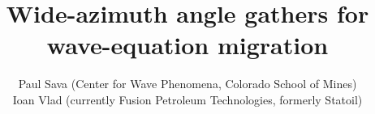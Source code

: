 



\title{Wide-azimuth angle gathers for wave-equation migration}
\author{
Paul Sava (Center for Wave Phenomena, Colorado School of Mines) \\
Ioan Vlad (currently Fusion Petroleum Technologies, formerly Statoil)
}
\maketitle















